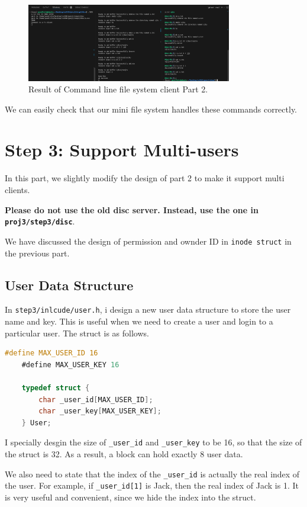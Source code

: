 \begin{figure}[!h]
    \centering
    \includegraphics[width=0.8\textwidth]{fig/fc2.png}
    \caption{Result of Command line file system client Part 2.}
    \label{fig:fc2}
\end{figure}

We can easily check that our mini file system handles these commands correctly.

\section{Step 3: Support Multi-users}
In this part, we slightly modify the design of part 2 to make it support multi clients.

\textbf{Please do not use the old disc server. Instead, use the one in \texttt{proj3/step3/disc}}.

We have discussed the design of permission and ownder ID in \texttt{inode struct} in the previous part.

\subsection{User Data Structure}
In \texttt{step3/inlcude/user.h}, i design a new user data structure to store the user name and key. This is useful when we need to
create a user and login to a particular user. The struct is as follows.

\begin{lstlisting}[language=C]
    #define MAX_USER_ID 16
    #define MAX_USER_KEY 16
    
    typedef struct {
        char _user_id[MAX_USER_ID];
        char _user_key[MAX_USER_KEY];
    } User;    
\end{lstlisting}

I specially desgin the size of \texttt{\_user\_id} and \texttt{\_user\_key} to be 16, so that the size of the struct is 32.
As a result, a block can hold exactly 8 user data.

We also need to state that the index of the \texttt{_user_id} is actually the real index of the user. For example, if \texttt{\_user\_id[1]} is Jack, then 
the real index of Jack is 1. It is very useful and convenient, since we hide the index into the struct.

